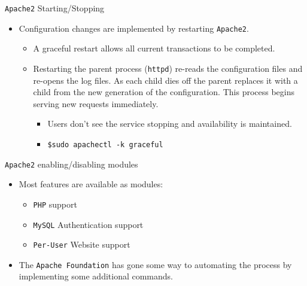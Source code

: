 \documentclass[xcolor=table]{beamer}
\begin{document}
\begin{frame}{\texttt{Apache2} Starting/Stopping}
  \begin{itemize}
    \item Configuration changes are implemented by restarting \texttt{Apache2}.
      \begin{itemize}
        \item A graceful restart allows all current transactions to be completed. 
        \item Restarting the parent process (\texttt{httpd}) re-reads the configuration files and re-opens the log files. As each child dies off the parent replaces it with a child from the new generation of the configuration. This process begins serving new requests immediately.
          \begin{itemize}
            \item Users don't see the service stopping and availability is maintained.
            \item \texttt{\$sudo apachectl -k graceful}
          \end{itemize}
      \end{itemize}
    \end{itemize}
\end{frame}

\begin{frame}{\texttt{Apache2} enabling/disabling modules}
  \begin{itemize}
    \item Most features are available as modules:
      \begin{itemize}
        \item \texttt{PHP} support
        \item \texttt{MySQL} Authentication support
        \item \texttt{Per-User} Website support
      \end{itemize}
    \item The \texttt{Apache Foundation} has gone some way to automating the process by implementing some additional commands.
  \end{itemize}
\end{frame}
\end{document}
